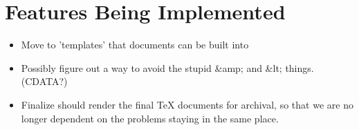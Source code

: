 \section{Features Being Implemented}
  \begin{itemize}
    \item Move to 'templates' that documents can be built into 
    \item Possibly figure out a way to avoid the stupid \&amp; and \&lt; things.
    (CDATA?)
    \item Finalize should render the final TeX documents for archival, so that 
    we are no longer dependent on the problems staying in the same place.
  \end{itemize}